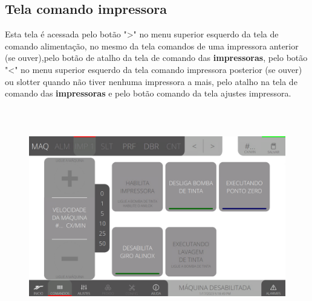 \thispagestyle{fancy}
\vspace*{\fill}
\subsection{Tela comando impressora}
 Esta tela é acessada pelo botão "\textgreater" no menu superior esquerdo da tela de comando alimentação, no mesmo da tela comandos de uma impressora anterior (se ouver),pelo botão de atalho da tela de comando das
\textbf{impressoras}, pelo botão "\textless{}" no menu superior esquerdo da tela comando impressora posterior (se ouver) ou slotter quando não tiver nenhuma impressora a mais, pelo atalho na tela de comando das \textbf{impressoras} e pelo botão comando da tela ajustes impressora.
\begin{figure}[h]
  \centering
  \includegraphics[width=576px,height=360px]{src/imagesFlexo/04-printter/02-printter/commands/e-Tela-Principal.png}
\end{figure}

\newpage
\thispagestyle{fancy}
\vspace*{\fill}
